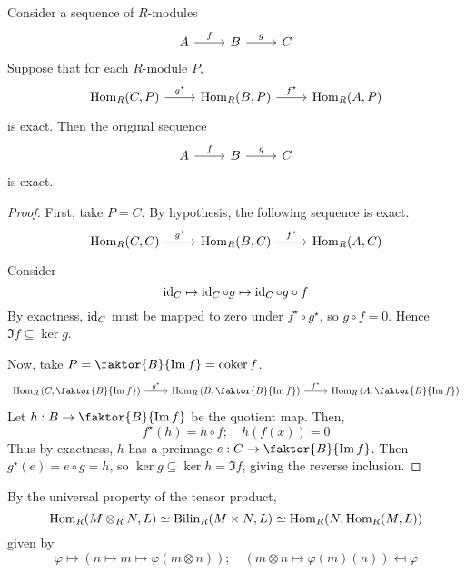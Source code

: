 \begin{lemma}
    Consider a sequence of \( R \)-modules
    \[\begin{tikzcd}
        A & B & C
        \arrow["f", from=1-1, to=1-2]
        \arrow["g", from=1-2, to=1-3]
    \end{tikzcd}\]
    Suppose that for each \( R \)-module \( P \),
    \[\begin{tikzcd}
        {\Hom_R(C, P)} & {\Hom_R(B, P)} & {\Hom_R(A, P)}
        \arrow["{g^\star}", from=1-1, to=1-2]
        \arrow["{f^\star}", from=1-2, to=1-3]
    \end{tikzcd}\]
    is exact.
    Then the original sequence
    \[\begin{tikzcd}
        A & B & C
        \arrow["f", from=1-1, to=1-2]
        \arrow["g", from=1-2, to=1-3]
    \end{tikzcd}\]
    is exact.
\end{lemma}
\begin{proof}
    First, take \( P = C \).
    By hypothesis, the following sequence is exact.
    \[\begin{tikzcd}
        {\Hom_R(C, C)} & {\Hom_R(B, C)} & {\Hom_R(A, C)}
        \arrow["{g^\star}", from=1-1, to=1-2]
        \arrow["{f^\star}", from=1-2, to=1-3]
    \end{tikzcd}\]
    Consider
    \[ \operatorname{id}_C \mapsto \operatorname{id}_C \circ g \mapsto \operatorname{id}_C \circ g \circ f \]
    By exactness, \( \operatorname{id}_C \) must be mapped to zero under \( f^\star \circ g^\star \), so \( g \circ f = 0 \).
    Hence \( \Im f \subseteq \ker g \).

    Now, take \( P = \faktor{B}{\Im f} = \coker f \).
    \[\begin{tikzcd}
        {\Hom_R\qty(C, \faktor{B}{\Im f})} & {\Hom_R\qty(B, \faktor{B}{\Im f})} & {\Hom_R\qty(A, \faktor{B}{\Im f})}
        \arrow["{g^\star}", from=1-1, to=1-2]
        \arrow["{f^\star}", from=1-2, to=1-3]
    \end{tikzcd}\]
    Let \( h : B \to \faktor{B}{\Im f} \) be the quotient map.
    Then,
    \[ f^\star(h) = h \circ f;\quad h(f(x)) = 0 \]
    Thus by exactness, \( h \) has a preimage \( e : C \to \faktor{B}{\Im f} \).
    Then \( g^\star(e) = e \circ g = h \), so \( \ker g \subseteq \ker h = \Im f \), giving the reverse inclusion.
\end{proof}
By the universal property of the tensor product,
\[ \operatorname{Hom}_R(M \otimes_R N, L) \simeq \operatorname{Bilin}_R(M \times N, L) \simeq \operatorname{Hom}_R(N, \operatorname{Hom}_R(M, L)) \]
given by
\[ \varphi \mapsto (n \mapsto m \mapsto \varphi(m \otimes n)) ;\quad (m \otimes n \mapsto \varphi(m)(n)) \mapsfrom \varphi \]
